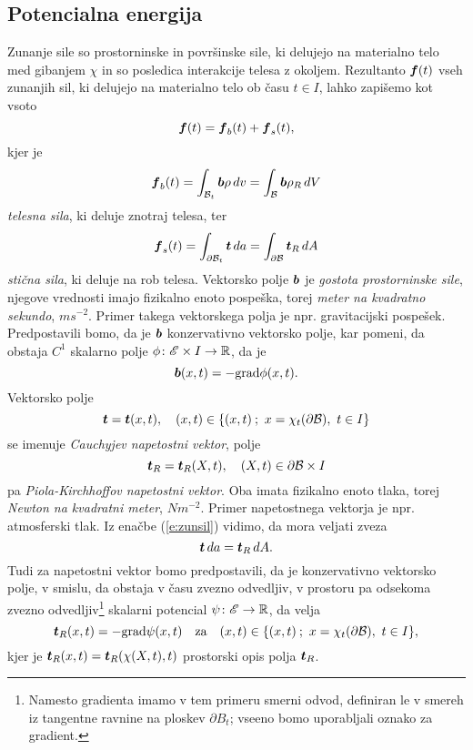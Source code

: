 \subsection{Potencialna energija}


Zunanje sile so prostorninske in površinske sile, ki delujejo na materialno telo med gibanjem $\chi$
in so posledica interakcije telesa z okoljem. Rezultanto $\boldsymbol f(t)$ vseh zunanjih sil, ki delujejo
na materialno telo ob času $t\in I$, lahko zapišemo kot vsoto
\[
	\boldsymbol f(t)=\boldsymbol f_b(t)+\boldsymbol f_s(t),
\]
kjer je
\[
	\boldsymbol f_b(t)=\int_{\mathcal B_t}\boldsymbol b\rho\, dv=\int_{\mathcal B}\boldsymbol b\rho_R\, dV
\]
\emph{telesna sila}, ki deluje znotraj telesa, ter
\begin{equation}\label{e:zunsil}
	\boldsymbol f_s(t)=\int_{\partial \mathcal B_t}\boldsymbol t\, da=\int_{\partial \mathcal B}\boldsymbol t_R\, dA
\end{equation}
\emph{stična sila}, ki deluje na rob telesa.
Vektorsko polje $\boldsymbol b$ je \emph{gostota prostorninske sile}, njegove vrednosti imajo fizikalno enoto
pospeška, torej \textit{meter na kvadratno sekundo}, $ms^{-2}$. Primer takega vektorskega polja
je npr. gravitacijski pospešek. Predpostavili bomo, da je $\boldsymbol b$ konzervativno vektorsko polje,
kar pomeni, da obstaja $C^1$ skalarno polje $\phi\colon\mathscr E\times I\to\mathbb R$, da je
\begin{equation*} \label{e:gps}
	\boldsymbol b(x,t)=-\mathrm{grad}\phi(x,t).
\end{equation*}
Vektorsko polje
\begin{equation*} \label{e:csv}
	\boldsymbol t=\boldsymbol t(x,t),\quad (x,t)\in \{(x,t)\:;\ x=\chi_t(\partial \mathcal B),\ t\in I\}
\end{equation*}
se imenuje \emph{Cauchyjev napetostni vektor}, polje
\begin{equation*} \label{e:pksv}
	\boldsymbol t_R=\boldsymbol t_R(X,t),\quad (X,t)\in \partial \mathcal B\times I
\end{equation*}
pa \emph{Piola-Kirchhoffov napetostni vektor}. Oba
imata fizikalno enoto tlaka, torej \textit{Newton na kvadratni meter}, $Nm^{-2}$.
Primer napetostnega vektorja je npr. atmosferski tlak.
Iz enačbe (\ref{e:zunsil}) vidimo, da mora veljati zveza
\begin{equation}\label{e:ttr}
	\boldsymbol t\, da=\boldsymbol t_R\, dA.
\end{equation}
Tudi za napetostni vektor bomo predpostavili, da je konzervativno vektorsko polje, v smislu,
da obstaja v času zvezno odvedljiv, v prostoru pa odsekoma zvezno odvedljiv\footnote{Namesto gradienta imamo v tem primeru
smerni odvod, definiran le v smereh iz tangentne ravnine na ploskev $\partial B_t$; vseeno bomo uporabljali oznako za gradient.}
skalarni potencial $\psi\colon\mathscr E\to\mathbb R$, da velja
\[ \boldsymbol t_R(x,t)=-\mathrm{grad}\psi(x,t)\quad\textrm{za}\quad (x,t)\in \{(x,t)\:;\ x=\chi_t(\partial \mathcal B),\ t\in I\}, \]
kjer je $\boldsymbol t_R(x,t)=\boldsymbol t_R(\chi(X,t),t)$ prostorski opis polja $\boldsymbol t_R$.

